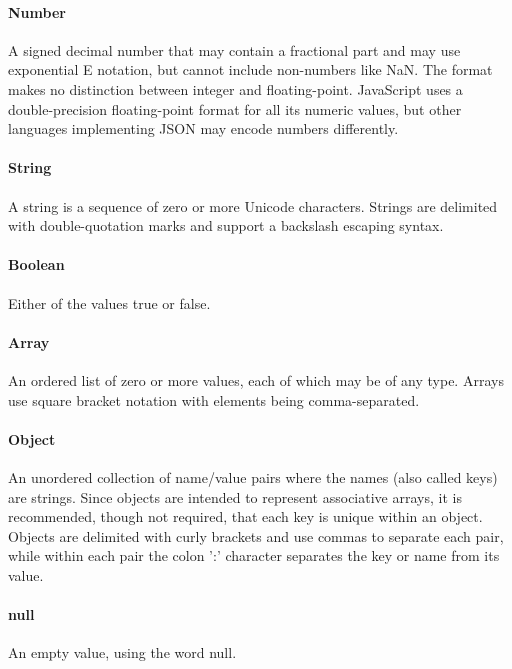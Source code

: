 \paragraph{Number} A signed decimal number that may contain a fractional part and may use exponential E notation, but cannot include non-numbers like NaN. The format makes no distinction between integer and floating-point. JavaScript uses a double-precision floating-point format for all its numeric values, but other languages implementing JSON may encode numbers differently.
\paragraph{String} A string is a sequence of zero or more Unicode characters. Strings are delimited with double-quotation marks and support a backslash escaping syntax.
\paragraph{Boolean} Either of the values true or false.
\paragraph{Array} An ordered list of zero or more values, each of which may be of any type. Arrays use square bracket notation with elements being comma-separated.
\paragraph{Object} An unordered collection of name/value pairs where the names (also called keys) are strings. Since objects are intended to represent associative arrays, it is recommended, though not required, that each key is unique within an object. Objects are delimited with curly brackets and use commas to separate each pair, while within each pair the colon ':' character separates the key or name from its value.
\paragraph{null} An empty value, using the word null.

